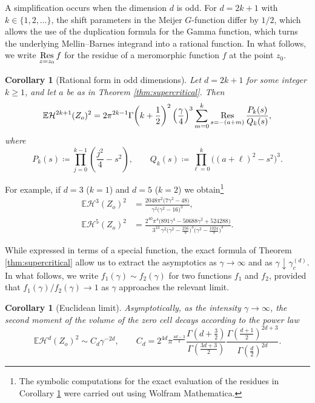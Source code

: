 \documentclass[11pt,a4paper]{article}
\theoremstyle{plain}
\newtheorem{corollary}[theorem]{Corollary}
\theoremstyle{definition}
\theoremstyle{remark}
\def\EE{\mathbb{E}}
\def\cH{\mathcal{H}}
\newcommand{\Res}{\mathop{\mathrm{Res}}\nolimits}
\begin{document}
A simplification occurs when the dimension $d$ is odd. For $d = 2k+1$ with $k \in \{1, 2, \dots\}$, the shift parameters in the Meijer $G$-function differ by $1/2$, which allows the use of the duplication formula for the Gamma function, which turns the underlying Mellin–Barnes integrand into a rational function. In what follows, we write $\Res\limits_{z=z_0}f$ for the residue of a meromorphic function \(f\) at the point \(z_0\).

\begin{corollary}[Rational form in odd dimensions]\label{cor:odd_dimensions}
	Let \(d=2k+1\) for some integer \(k\ge 1\), and let $a$ be as in Theorem \ref{thm:supercritical}.
	Then
	\[
	\EE \cH^{2k+1}(Z_o)^2
	=
	2\pi^{2k-1}\Gamma\!\left(k+\frac12\right)^2\left(\frac{\gamma}{4}\right)^3
	\sum_{m=0}^{k}
	\Res\limits_{s=-(a+m)} \frac{P_k(s)}{Q_k(s)},
	\]
	where
	\[
	P_k(s)\coloneqq\prod_{j=0}^{k-1}\left(\frac{j^2}{4}-s^2\right),
	\qquad
	Q_k(s)\coloneqq\prod_{\ell=0}^{k}\bigl((a+\ell)^2-s^2\bigr)^3.
	\]
\end{corollary}

For example, if $d=3$ ($k=1$) and $d=5$ ($k=2$) we obtain\footnote{The symbolic computations for the exact evaluation of the residues in Corollary \ref{cor:odd_dimensions} were carried out using Wolfram Mathematica.}
\begin{align*}
	\EE \cH^{3}(Z_o)^2
	&=
	\frac{2048\pi^2\bigl(7\gamma^2-48\bigr)}
	{\gamma^2\bigl(\gamma^2-16\bigr)^3},\\
\EE \cH^{5}(Z_o)^2
&=
\frac{2^{40}\pi^4\bigl(891\gamma^4-50688\gamma^2+524288\bigr)}
{3^{13}\,\gamma^2\bigl(\gamma^2-\frac{256}{9}\bigr)^3\bigl(\gamma^2-\frac{1024}{9}\bigr)^3}.
\end{align*}


While expressed in terms of a special function, the exact formula of Theorem \ref{thm:supercritical} allow us to extract the asymptotics as $\gamma\to\infty$ and as $\gamma\downarrow\gamma_c^{(d)}$. In what follows, we write $f_1(\gamma)\sim f_2(\gamma)$ for two functions $f_1$ and $f_2$, provided that $f_1(\gamma)/f_2(\gamma)\to 1$ as $\gamma$ approaches the relevant limit.

\begin{corollary}[Euclidean limit]\label{cor:GammaToInfinity_d}
	Asymptotically, as the intensity $\gamma \to \infty$, the second moment of the volume of the zero cell decays according to the power law
	\[
	\EE\cH^d(Z_o)^2 \sim C_d \gamma^{-2d},\qquad C_d = 2^{4d} \pi^{\frac{4d-3}{2}} \frac{\Gamma\left(d+\frac{3}{2}\right)}{\Gamma\left(\frac{3d+3}{2}\right)} \frac{\Gamma\left(\frac{d+1}{2}\right)^{2d+3}}{\Gamma\left(\frac{d}{2}\right)^{2d}}.
	\]
\end{corollary}
\end{document}
